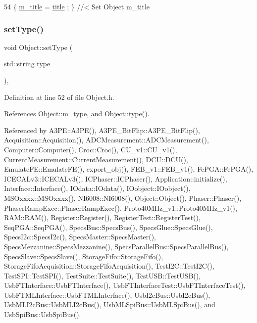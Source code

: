 \begin{DoxyCode}
54 \{ \hyperlink{classObject_affbeea1953eb5163573b92fad8f75727}{m\_title} = \hyperlink{classObject_a73a0f1a41828fdd8303dd662446fb6c3}{title} ; \} \textcolor{comment}{//< Set Object m\_title}
\end{DoxyCode}
\mbox{\label{classObject_aae534cc9d982bcb9b99fd505f2e103a5}} 
\subsubsection{\texorpdfstring{set\+Type()}{setType()}}
{\footnotesize\ttfamily void Object\+::set\+Type (\begin{DoxyParamCaption}\item[{std\+::string}]{type }\end{DoxyParamCaption})\hspace{0.3cm}{\ttfamily [inline]}, {\ttfamily [inherited]}}



Definition at line 52 of file Object.\+h.



References Object\+::m\+\_\+type, and Object\+::type().



Referenced by A3\+P\+E\+::\+A3\+P\+E(), A3\+P\+E\+\_\+\+Bit\+Flip\+::\+A3\+P\+E\+\_\+\+Bit\+Flip(), Acquisition\+::\+Acquisition(), A\+D\+C\+Measurement\+::\+A\+D\+C\+Measurement(), Computer\+::\+Computer(), Croc\+::\+Croc(), C\+U\+\_\+v1\+::\+C\+U\+\_\+v1(), Current\+Measurement\+::\+Current\+Measurement(), D\+C\+U\+::\+D\+C\+U(), Emulate\+F\+E\+::\+Emulate\+F\+E(), export\+\_\+obj(), F\+E\+B\+\_\+v1\+::\+F\+E\+B\+\_\+v1(), Fe\+P\+G\+A\+::\+Fe\+P\+G\+A(), I\+C\+E\+C\+A\+Lv3\+::\+I\+C\+E\+C\+A\+Lv3(), I\+C\+Phaser\+::\+I\+C\+Phaser(), Application\+::initialize(), Interface\+::\+Interface(), I\+Odata\+::\+I\+Odata(), I\+Oobject\+::\+I\+Oobject(), M\+S\+Oxxxx\+::\+M\+S\+Oxxxx(), N\+I6008\+::\+N\+I6008(), Object\+::\+Object(), Phaser\+::\+Phaser(), Phaser\+Ramp\+Exec\+::\+Phaser\+Ramp\+Exec(), Proto40\+M\+Hz\+\_\+v1\+::\+Proto40\+M\+Hz\+\_\+v1(), R\+A\+M\+::\+R\+A\+M(), Register\+::\+Register(), Register\+Test\+::\+Register\+Test(), Seq\+P\+G\+A\+::\+Seq\+P\+G\+A(), Specs\+Bus\+::\+Specs\+Bus(), Specs\+Glue\+::\+Specs\+Glue(), Specs\+I2c\+::\+Specs\+I2c(), Specs\+Master\+::\+Specs\+Master(), Specs\+Mezzanine\+::\+Specs\+Mezzanine(), Specs\+Parallel\+Bus\+::\+Specs\+Parallel\+Bus(), Specs\+Slave\+::\+Specs\+Slave(), Storage\+Fifo\+::\+Storage\+Fifo(), Storage\+Fifo\+Acquisition\+::\+Storage\+Fifo\+Acquisition(), Test\+I2\+C\+::\+Test\+I2\+C(), Test\+S\+P\+I\+::\+Test\+S\+P\+I(), Test\+Suite\+::\+Test\+Suite(), Test\+U\+S\+B\+::\+Test\+U\+S\+B(), Usb\+F\+T\+Interface\+::\+Usb\+F\+T\+Interface(), Usb\+F\+T\+Interface\+Test\+::\+Usb\+F\+T\+Interface\+Test(), Usb\+F\+T\+M\+L\+Interface\+::\+Usb\+F\+T\+M\+L\+Interface(), Usb\+I2c\+Bus\+::\+Usb\+I2c\+Bus(), Usb\+M\+L\+I2c\+Bus\+::\+Usb\+M\+L\+I2c\+Bus(), Usb\+M\+L\+Spi\+Bus\+::\+Usb\+M\+L\+Spi\+Bus(), and Usb\+Spi\+Bus\+::\+Usb\+Spi\+Bus().


